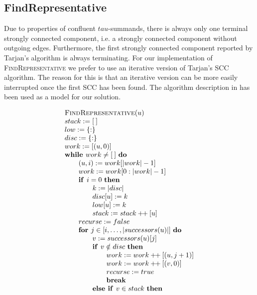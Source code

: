 \documentclass{article}
\newcommand{\concat}{\ensuremath{+\!\!+\:}}
\newcommand{\emptymap}{\ensuremath{\{ : \}}}
\newcommand{\emptylist}{\ensuremath{[\:]}}
\newcommand{\Space}{\text{\ }}
\newcommand{\If}{\text{\textbf{if }}}
\newcommand{\Do}{\text{\textbf{do }}}
\newcommand{\Then}{\text{\textbf{then }}}
\newcommand{\Else}{\text{\textbf{else }}}
\newcommand{\For}{\text{\textbf{for }}}
\newcommand{\While}{\text{\textbf{while }}}
\newcommand{\Break}{\text{\textbf{break }}}
\begin{document}
\subsection{FindRepresentative}
Due to properties of confluent $tau$-summands, there is always only one terminal strongly connected component, i.e. a strongly connected component without outgoing edges. Furthermore, the first strongly connected component reported by Tarjan's algorithm is always terminating. For our implementation of \textsc{FindRepresentative} we prefer to use an iterative version of Tarjan's SCC algorithm. The reason for this is that an iterative version can be more easily interrupted once the first SCC has been found. The algorithm description in \cite{TarjanIterative} has been used as a model for our solution.

\[
\begin{tabular}{l}
\textsc{FindRepresentative}$(u)$ \\
$stack := \emptylist$ \\
$low := \emptymap$ \\
$disc := \emptymap$ \\
$work := [(u, 0)]$ \\
$\While work \neq \emptylist \Space \Do$ \\
\qquad $(u, i) := work[|work| - 1]$ \\
\qquad $work := work[0 : |work| - 1]$ \\
\qquad $\If i = 0 \Space \Then$ \\
\qquad \qquad $k := |disc|$ \\
\qquad \qquad $disc[u] := k$ \\
\qquad \qquad $low[u] := k$ \\
\qquad \qquad $stack := stack \concat [u]$ \\
\qquad $recurse := false$ \\
\qquad $\For j \in [i, \ldots, |successors(u)|]$ \Do \\
\qquad \qquad $v := successors(u)[j]$ \\
\qquad \qquad $\If v \notin disc$ \Then \\
\qquad \qquad \qquad $work := work \concat [(u, j+1)]$ \\
\qquad \qquad \qquad $work := work \concat [(v, 0)]$ \\
\qquad \qquad \qquad $recurse := true$ \\
\qquad \qquad \qquad \Break \\
\qquad \qquad \Else \If $v \in stack$ \Then \\

\end{tabular}\]
\end{document}
